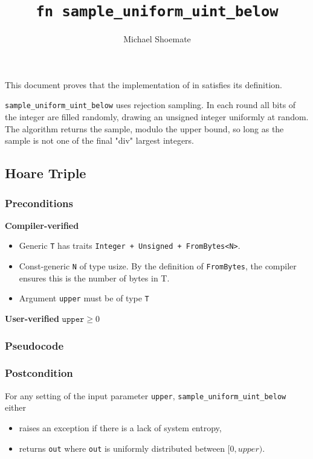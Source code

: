 \documentclass{article}
\title{\texttt{fn sample\_uniform\_uint\_below}}
\author{Michael Shoemate}
\begin{document}
 
\maketitle 
 
This document proves that the implementation of  in   
satisfies its definition. 
 
\texttt{sample\_uniform\_uint\_below} uses rejection sampling.  
In each round all bits of the integer are filled randomly, drawing an unsigned integer uniformly at random. 
The algorithm returns the sample, modulo the upper bound, so long as the sample is not one of the final "div" largest integers. 
 
\subsection{Hoare Triple} 
\subsubsection*{Preconditions} 
 
\textbf{Compiler-verified} 
\begin{itemize} 
    \item Generic \texttt{T} has traits \texttt{Integer + Unsigned + FromBytes<N>}. 
    \item Const-generic \texttt{N} of type usize. By the definition of \texttt{FromBytes}, the compiler ensures this is the number of bytes in T. 
    \item Argument \texttt{upper} must be of type \texttt{T} 
\end{itemize} 
 
\textbf{User-verified} 
$\texttt{upper} \geq 0$ 
 
\subsubsection*{Pseudocode} 
 
 
 
\subsubsection*{Postcondition} 
For any setting of the input parameter \texttt{upper}, 
\texttt{sample\_uniform\_uint\_below} either 
\begin{itemize} 
    \item raises an exception if there is a lack of system entropy, 
    \item returns \texttt{out} where \texttt{out} is uniformly distributed between $[0, upper)$. 
\end{itemize} 
 
\end{document}
